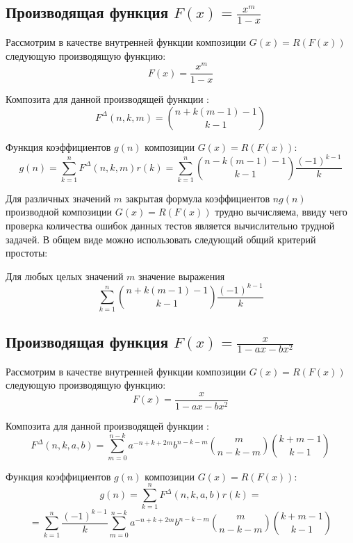 \documentclass[
russian,
cp1251,
14pt,
simple
]{eskdtext}
\theoremstyle{definition}
\begin{document}
\subsection{Производящая функция $F(x)=\frac{x^m}{1-x}$}
Рассмотрим в качестве внутренней функции композиции $G(x)=R(F(x))$ следующую производящую функцию:
$$
F(x)=\frac{x^m}{1 - x}
$$

Композита для данной производящей функции \cite{KruchininVV}:
$$
F^\Delta(n,k,m)={n + k(m-1) - 1 \choose k - 1}
$$

Функция коэффициентов $g(n)$ композиции $G(x)=R(F(x))$:
$$
g(n)=\sum\limits _{k=1}^{n}{F^\Delta(n,k,m)r(k)}=\sum\limits _{k=1}^{n}{n - k(m-1) - 1 \choose k - 1}\frac{(-1)^{k-1}}{k}
$$

Для различных значений $m$ закрытая формула коэффициентов $ng(n)$ производной композиции $G(x)=R(F(x))$ трудно вычисляема, ввиду чего проверка количества ошибок данных тестов является вычислительно трудной задачей. В общем виде можно использовать следующий общий критерий простоты:

Для любых целых значений $m$ значение выражения
$$
\sum\limits _{k=1}^{n}{n + k(m-1) - 1 \choose k - 1} \frac{(-1)^{k-1}}{k}
$$

\subsection{Производящая функция $F(x)=\frac{x}{1 - a x - b x^2}$}
Рассмотрим в качестве внутренней функции композиции $G(x)=R(F(x))$ следующую производящую функцию:
$$
F(x)=\frac{x}{1 - ax - bx^2}
$$

Композита для данной производящей функции \cite{KruchininVV}:
$$
F^\Delta(n,k,a,b)=\sum\limits _{m=0}^{n-k} a^{-n + k + 2m}b^{n - k - m}{m \choose n-k-m}{k+m-1 \choose k-1}
$$

Функция коэффициентов $g(n)$ композиции $G(x)=R(F(x))$:
$$
g(n)=\sum\limits _{k=1}^{n}{F^\Delta(n,k,a,b)r(k)}=
$$
$$
=\sum\limits _{k=1}^{n}\frac{(-1)^{k-1}}{k}  \sum\limits _{m=0}^{n-k} a^{-n + k + 2m}b^{n - k - m}{m \choose n-k-m}{k+m-1 \choose k-1}
$$
\end{document}
